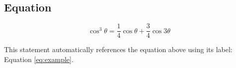 
\begin{fullwidth}
    \section{Equation}

    \begin{equation}
        \cos^3 \theta =\frac{1}{4}\cos\theta+\frac{3}{4}\cos 3\theta
        \label{eq:example}
    \end{equation}

    This statement automatically references the equation above using its label: Equation \ref{eq:example}.
\end{fullwidth}
